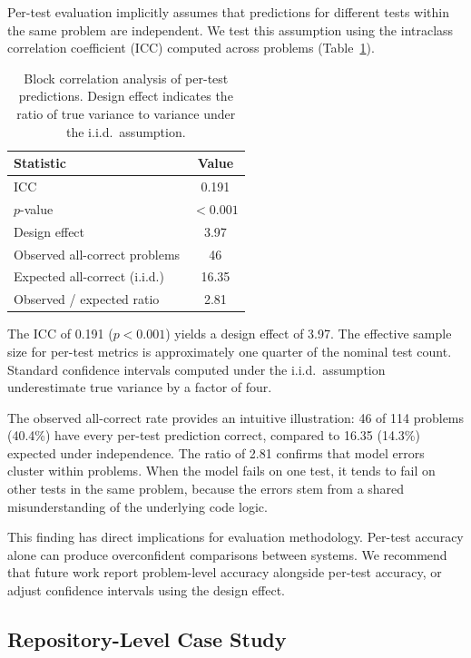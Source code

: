 \documentclass[11pt,a4paper]{article}
\begin{document}
Per-test evaluation implicitly assumes that predictions for different tests within the same problem are independent. We test this assumption using the intraclass correlation coefficient (ICC) computed across problems (Table~\ref{tab:icc}).

\begin{table}[t]
\centering
\caption{Block correlation analysis of per-test predictions. Design effect indicates the ratio of true variance to variance under the i.i.d.\ assumption.}
\label{tab:icc}
\small
\begin{tabular}{lc}
\toprule
Statistic & Value \\
\midrule
ICC & 0.191 \\
$p$-value & $< 0.001$ \\
Design effect & 3.97 \\
Observed all-correct problems & 46 \\
Expected all-correct (i.i.d.) & 16.35 \\
Observed / expected ratio & 2.81 \\
\bottomrule
\end{tabular}
\end{table}

The ICC of 0.191 ($p < 0.001$) yields a design effect of 3.97. The effective sample size for per-test metrics is approximately one quarter of the nominal test count. Standard confidence intervals computed under the i.i.d.\ assumption underestimate true variance by a factor of four.

The observed all-correct rate provides an intuitive illustration: 46 of 114 problems (40.4\%) have every per-test prediction correct, compared to 16.35 (14.3\%) expected under independence. The ratio of 2.81 confirms that model errors cluster within problems. When the model fails on one test, it tends to fail on other tests in the same problem, because the errors stem from a shared misunderstanding of the underlying code logic.

This finding has direct implications for evaluation methodology. Per-test accuracy alone can produce overconfident comparisons between systems. We recommend that future work report problem-level accuracy alongside per-test accuracy, or adjust confidence intervals using the design effect.

\subsection{Repository-Level Case Study}
\label{sec:repo}
\end{document}
